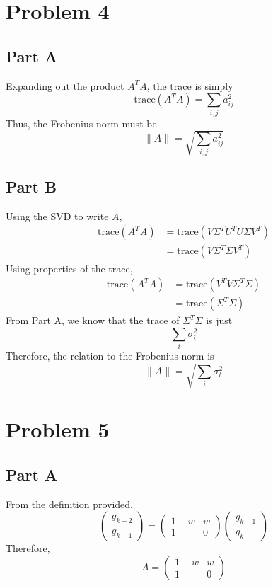 \documentclass{article}
\begin{document}
\section*{Problem 4}

\subsection*{Part A}

Expanding out the product $A^T A$, the trace is simply
$$ \mathrm{trace}(A^T A) = \sum_{i, j} a_{ij}^2 $$
Thus, the Frobenius norm must be
$$ \lVert A \rVert = \sqrt{\sum_{i, j} a_{ij}^2} $$

\subsection*{Part B}

Using the SVD to write $A$,
\begin{align*}
  \mathrm{trace}(A^T A) &= \mathrm{trace}(V \Sigma^T U^T U \Sigma V^T) \\
  &= \mathrm{trace}(V \Sigma^T \Sigma V^T)
\end{align*}
Using properties of the trace,
\begin{align*}
  \mathrm{trace}(A^T A) &= \mathrm{trace}(V^T V \Sigma^T \Sigma) \\
  &= \mathrm{trace}(\Sigma^T \Sigma)
\end{align*}
From Part A, we know that the trace of $\Sigma^T \Sigma$ is just
$$ \sum_{i} \sigma_i^2 $$
Therefore, the relation to the Frobenius norm is
$$ \rVert A \lVert = \sqrt{\sum_i \sigma_t^2} $$

\section*{Problem 5}

\subsection*{Part A}

From the definition provided,
$$ \begin{pmatrix}
  g_{k+2} \\
  g_{k+1}
\end{pmatrix} = \begin{pmatrix}
  1 - w & w \\
  1 & 0
\end{pmatrix} \begin{pmatrix}
  g_{k+1} \\
  g_k
\end{pmatrix} $$
Therefore,
$$ A =  \begin{pmatrix}
  1 - w & w \\
  1 & 0
\end{pmatrix} $$
\end{document}

